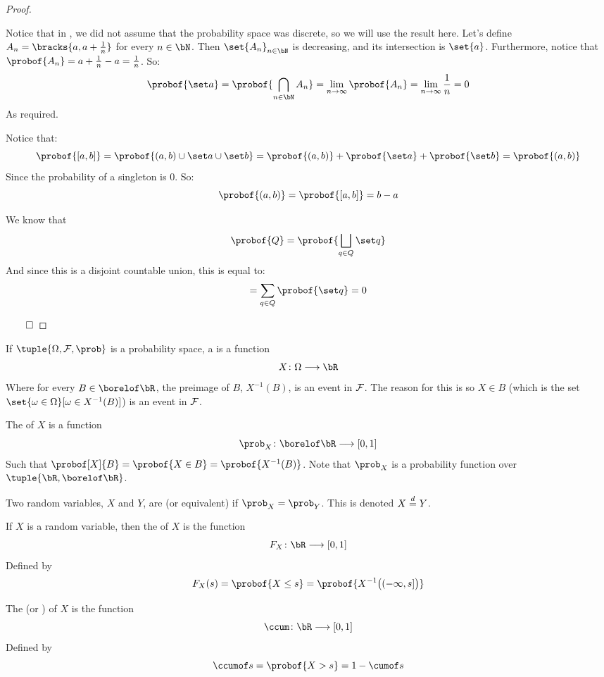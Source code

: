 \begin{proof}

	\begin{msecenumerate}[0pt]
		\mitem Notice that in , we did not assume that the probability space was discrete, so
			we will use the result here.
			Let's define $A_n=\bracks{a,a+\frac1n}$ for every $n\in\bN$.
			Then $\set{A_n}_{n\in\bN}$ is decreasing, and its intersection is $\set{a}$.
			Furthermore, notice that $\probof{A_n}=a+\frac1n-a=\frac1n$.
			So:
			\[ \probof{\set a} = \probof{\bigcap_{n\in\bN}A_n} = \lim_{n\to\infty}\probof{A_n} = \lim_{n\to\infty}\frac1n = 0 \]
			As required.

		\mitem Notice that:
			\[ \probof{[a,b]} = \probof{(a,b)\cup\set a\cup\set b} = \probof{(a,b)} + \probof{\set a}+\probof{\set b} = \probof{(a,b)} \]
			Since the probability of a singleton is $0$.
			So:
			\[ \probof{(a,b)} = \probof{[a,b]} = b - a \]

		\mitem We know that
			\[ \probof{Q} = \probof{\bigsqcup_{q\in Q}\set q} \]
			And since this is a disjoint countable union, this is equal to:
			\[ = \sum_{q\in Q}\probof{\set q} = 0 \]
	\end{msecenumerate}

	\hfill$\qed$

\end{proof}

\begin{defn*}

	If $\tuple{\Omega,\cF,\prob}$ is a probability space, a  is a function
	\[ X\colon\Omega\longrightarrow\bR \]
	Where for every $B\in\borelof\bR$, the preimage of $B$, $X^{-1}(B)$, is an event in ${\cal F}$.
	The reason for this is so $X\in B$ (which is the set $\set{\omega\in\Omega}[\omega\in X^{-1}(B)]$) is an event in ${\cal F}$.

	The  of $X$ is a function
	\[ \prob_X\colon\borelof\bR\longrightarrow[0,1] \]
	Such that $\probof[X]{B}=\probof{X\in B}=\probof{X^{-1}(B)}$.
	Note that $\prob_X$ is a probability function over $\tuple{\bR,\borelof\bR}$.

	Two random variables, $X$ and $Y$, are  (or equivalent) if $\prob_X=\prob_Y$.
	This is denoted $X\mathrel{\overset d=} Y$.

\end{defn*}

\begin{defn*}

	If $X$ is a random variable, then the  of $X$ is the function
	\[ F_X\colon\bR\longrightarrow[0,1] \]
	Defined by
	\[ F_X(s) = \probof{X\leq s} = \probof{X^{-1}\big((-\infty,s]\big)} \]

	The  (or ) of $X$ is the function
	\[ \ccum\colon\bR\longrightarrow[0,1] \]
	Defined by
	\[ \ccumof s = \probof{X>s} = 1 - \cumof s \]

\end{defn*}

